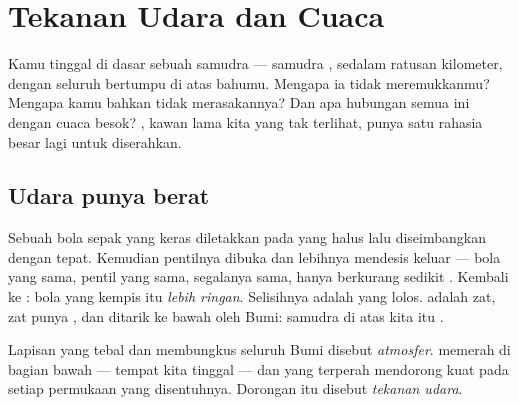 \chapter{Tekanan Udara dan Cuaca}\label{ch:g5:air-pressure-weather}

Kamu tinggal di dasar sebuah samudra --- samudra , sedalam
ratusan kilometer, dengan seluruh  bertumpu di atas bahumu.
Mengapa ia tidak meremukkanmu? Mengapa kamu bahkan tidak merasakannya?
Dan apa hubungan semua ini dengan cuaca besok? , kawan lama kita
yang tak terlihat, punya satu rahasia besar lagi untuk diserahkan.

\section{Udara punya berat}

\begin{example}\label{ex:g5:air-pressure-weather:weighing}
Sebuah bola sepak yang keras diletakkan pada  yang halus lalu
diseimbangkan dengan tepat. Kemudian pentilnya dibuka dan 
lebihnya mendesis keluar --- bola yang sama, pentil yang sama,
segalanya sama, hanya berkurang sedikit . Kembali ke : bola
yang kempis itu \emph{lebih ringan}. Selisihnya adalah  
yang lolos.  adalah zat, zat punya , dan  ditarik ke
bawah oleh Bumi: samudra di atas kita itu .
\end{example}

\begin{definition}\label{def:g5:air-pressure-weather:pressure}
Lapisan  yang tebal dan membungkus seluruh Bumi disebut
\emph{atmosfer}.  memerah  di bagian
bawah --- tempat kita tinggal --- dan  yang terperah mendorong
kuat pada setiap permukaan yang disentuhnya. Dorongan itu disebut
\emph{tekanan udara}.
\end{definition}

